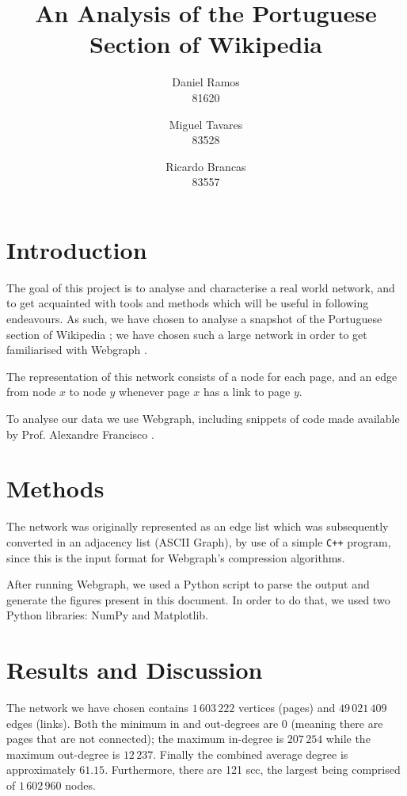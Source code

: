 \documentclass[9pt,a4paper,twocolumn]{article}
\title{An Analysis of the Portuguese Section of Wikipedia}
\author{Daniel Ramos \\ 81620 \and Miguel Tavares \\ 83528 \and Ricardo Brancas  \\ 83557}
\begin{document}
\maketitle

\section{Introduction}
The goal of this project is to analyse and characterise a real world network, and to  get acquainted with tools and methods which will be useful in following endeavours.
As such, we have chosen to analyse a snapshot of the Portuguese section of Wikipedia \cite{dataset};
we have chosen such a large network in order to get familiarised with Webgraph \cite{webgraph}.

The representation of this network consists of a node for each page, and an edge from node $x$ to node $y$ whenever page $x$ has a link to page $y$.

To analyse our data we use Webgraph, including snippets of code made available
by Prof. Alexandre Francisco \cite{aplf}.


\section{Methods}
The network was originally represented as an edge list which was subsequently converted in an adjacency list (ASCII Graph), by use of a simple \texttt{C++} program, since this is the input
format for Webgraph's compression algorithms.

After running Webgraph, we used a Python script to parse the output and generate the figures present in this document.
In order to do that, we used two Python libraries: NumPy and Matplotlib.

\section{Results and Discussion}

The network we have chosen contains $1\,603\,222$ vertices (pages) and $49\,021\,409$ edges (links). Both the minimum in and out-degrees are $0$ (meaning there are pages that are not connected); the maximum in-degree is $207\,254$ while the maximum out-degree is $12\,237$. Finally the combined average degree is approximately $61.15$. Furthermore, there are 121 \acrlong{scc}, the largest being comprised of $1\,602\,960$ nodes.
\vspace{1\baselineskip}
\end{document}
